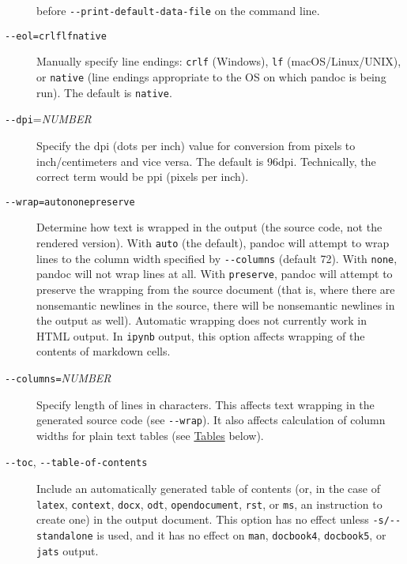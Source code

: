 \begin{description}
before \texttt{-\/-print-default-data-file} on the command line.
\item[\texttt{-\/-eol=crlf}\textbar{}\texttt{lf}\textbar{}\texttt{native}]
Manually specify line endings: \texttt{crlf} (Windows), \texttt{lf}
(macOS/Linux/UNIX), or \texttt{native} (line endings appropriate to the
OS on which pandoc is being run). The default is \texttt{native}.
\item[\texttt{-\/-dpi}=\emph{NUMBER}]
Specify the dpi (dots per inch) value for conversion from pixels to
inch/centimeters and vice versa. The default is 96dpi. Technically, the
correct term would be ppi (pixels per inch).
\item[\texttt{-\/-wrap=auto}\textbar{}\texttt{none}\textbar{}\texttt{preserve}]
Determine how text is wrapped in the output (the source code, not the
rendered version). With \texttt{auto} (the default), pandoc will attempt
to wrap lines to the column width specified by \texttt{-\/-columns}
(default 72). With \texttt{none}, pandoc will not wrap lines at all.
With \texttt{preserve}, pandoc will attempt to preserve the wrapping
from the source document (that is, where there are nonsemantic newlines
in the source, there will be nonsemantic newlines in the output as
well). Automatic wrapping does not currently work in HTML output. In
\texttt{ipynb} output, this option affects wrapping of the contents of
markdown cells.
\item[\texttt{-\/-columns=}\emph{NUMBER}]
Specify length of lines in characters. This affects text wrapping in the
generated source code (see \texttt{-\/-wrap}). It also affects
calculation of column widths for plain text tables (see
\protect\hyperlink{tables}{Tables} below).
\item[\texttt{-\/-toc}, \texttt{-\/-table-of-contents}]
Include an automatically generated table of contents (or, in the case of
\texttt{latex}, \texttt{context}, \texttt{docx}, \texttt{odt},
\texttt{opendocument}, \texttt{rst}, or \texttt{ms}, an instruction to
create one) in the output document. This option has no effect unless
\texttt{-s/-\/-standalone} is used, and it has no effect on
\texttt{man}, \texttt{docbook4}, \texttt{docbook5}, or \texttt{jats}
output.


\end{description}
